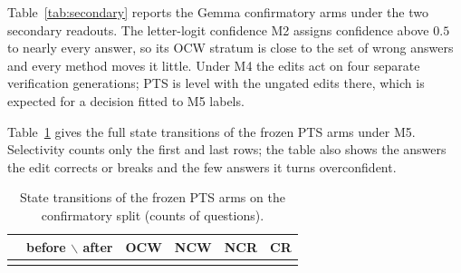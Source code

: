 \documentclass{article}
\newcommand{\ocw}{OCW}
\begin{document}
Table~\ref{tab:secondary} reports the Gemma confirmatory arms under the two
secondary readouts. The letter-logit confidence M2 assigns confidence above
$0.5$ to nearly every answer, so its \ocw{} stratum is close to the set of wrong
answers and every method moves it little. Under M4 the edits act on four
separate verification generations; PTS is level with the ungated edits there,
which is expected for a decision fitted to M5 labels.

\begin{table}[h]\footnotesize\setlength{\tabcolsep}{3pt}
\centering
{}
\caption{Secondary readouts on the confirmatory split; paired bootstrap
intervals, no multiplicity adjustment.}
\label{tab:secondary}
\end{table}

\begin{table}[h]\footnotesize\setlength{\tabcolsep}{3pt}
\centering
{}
\caption{Secondary readouts on the Qwen confirmatory split.}
\label{tab:secondary-qwen}
\end{table}

Table~\ref{tab:transitions} gives the full state transitions of the frozen
PTS arms under M5. Selectivity counts only the first and last rows; the table
also shows the answers the edit corrects or breaks and the few answers it turns
overconfident.

\begin{table}[h]\footnotesize\setlength{\tabcolsep}{5pt}
\centering
\begin{tabular}{ll|cccc}
\hline
 & before $\backslash$ after & OCW & NCW & NCR & CR \\
\hline
{}{gen/transitions}
\end{tabular}
\caption{State transitions of the frozen PTS arms on the confirmatory split
(counts of questions).}
\label{tab:transitions}
\end{table}
\end{document}
